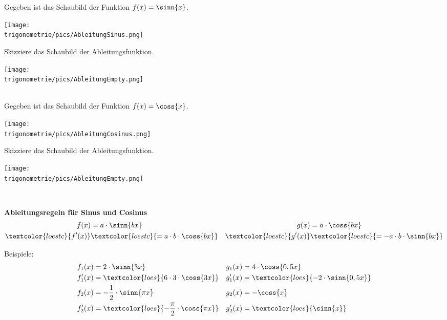 Gegeben ist das Schaubild der Funktion \(f(x)=\sinn{x}\).\\
\begin{minipage}{\textwidth}
	\texttt{[image: \\trigonometrie/pics/AbleitungSinus.png]}
\end{minipage}
Skizziere das Schaubild der Ableitungsfunktion.\\
\begin{minipage}{\textwidth}
	\texttt{[image: \\trigonometrie/pics/AbleitungEmpty.png]}
\end{minipage}\vspace{\baselineskip}\\
Gegeben ist das Schaubild der Funktion \(f(x)=\coss{x}\).\\
\begin{minipage}{\textwidth}
	\texttt{[image: \\trigonometrie/pics/AbleitungCosinus.png]}
\end{minipage}
Skizziere das Schaubild der Ableitungsfunktion.\\
\begin{minipage}{\textwidth}
	\texttt{[image: \\trigonometrie/pics/AbleitungEmpty.png]}
\end{minipage}\vspace{\baselineskip}\\
\begin{tcolorbox}
	\textbf{Ableitungsregeln für Sinus und Cosinus
		\begin{align*}
			f(x)&=a\cdot\sinn{bx}&g(x)&=a\cdot\coss{bx}\\
			\textcolor{loestc}{f'(x)}&\textcolor{loestc}{=a\cdot b\cdot\coss{bx}}&\textcolor{loestc}{g'(x)}&\textcolor{loestc}{=-a\cdot b\cdot\sinn{bx}}\\
		\end{align*}
	}
\end{tcolorbox}
Beispiele:
\begin{align*}
	f_1(x)&=2\cdot\sinn{3x}&g_1(x)&=4\cdot\coss{0,5x}\\
	f_1'(x)&=\textcolor{loes}{6\cdot 3\cdot\coss{3x}}&g_1'(x)&=\textcolor{loes}{-2\cdot\sinn{0,5x}}\\
	f_2(x)&=-\frac{1}{2}\cdot\sinn{\pi x}&g_2(x)&=-\coss{x}\\
	f_2'(x)&=\textcolor{loes}{-\frac{\pi}{2}\cdot\coss{\pi x}}&g_2'(x)&=\textcolor{loes}{\sinn{x}}\\
\end{align*}


